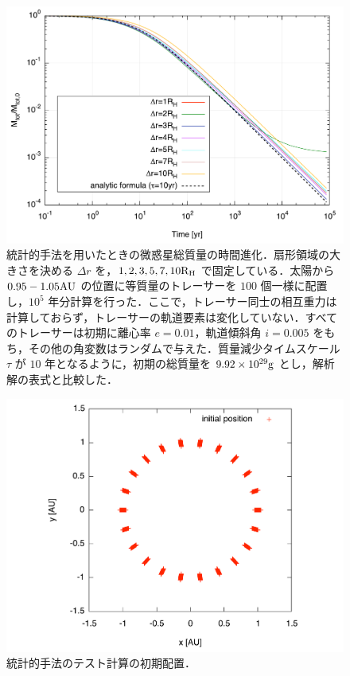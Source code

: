 \documentclass[11pt,a4paper,oneside,onecolumn]{jreport}
\begin{document}
\begin{figure}[H]
 \centering
 \includegraphics[width=12cm]{./image/MassDepletion_NoInteraction_2_100kyr.pdf}
 \caption{統計的手法を用いたときの微惑星総質量の時間進化．扇形領域の大きさを決める $\Delta r$ を，$1,2,3,5,7,10 {\rm R_H}$ で固定している．太陽から $0.95 - 1.05 {\rm AU}$ の位置に等質量のトレーサーを $100$ 個一様に配置し，$10^5$ 年分計算を行った．ここで，トレーサー同士の相互重力は計算しておらず，トレーサーの軌道要素は変化していない．すべてのトレーサーは初期に離心率 $e = 0.01$，軌道傾斜角 $i = 0.005$ をもち，その他の角変数はランダムで与えた．質量減少タイムスケール $\tau$ が $10$ 年となるように，初期の総質量を $9.92 \times 10^{29} {\rm g}$ とし，解析解の表式\cite{3}と比較した．\label{}}
\end{figure}



\begin{figure}[H]
 \centering
 \includegraphics[width=12cm]{./image/initial_position_xy.pdf}
 \caption{統計的手法のテスト計算の初期配置．\label{}}
\end{figure}
\end{document}
